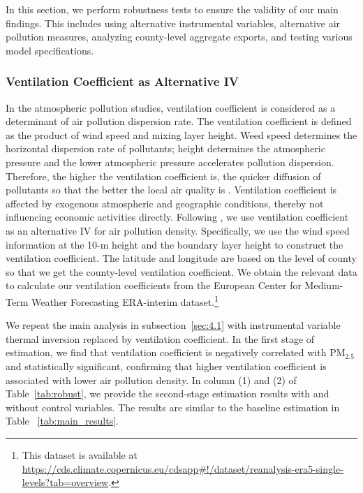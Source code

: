 \documentclass[12pt]{article}
\begin{document}
In this section, we perform robustness tests to ensure the validity of our main findings. This includes using alternative instrumental variables, alternative air pollution measures, analyzing county-level aggregate exports, and testing various model specifications.

\subsubsection{Ventilation Coefficient as Alternative IV}
In the atmospheric pollution studies, ventilation coefficient is considered as a determinant of air pollution dispersion rate.
The ventilation coefficient is defined as the product of wind speed and mixing layer height. Weed speed determines the horizontal dispersion rate
of pollutants; height determines the atmospheric pressure and the lower atmospheric pressure accelerates pollution dispersion. Therefore, the higher
the ventilation coefficient is, the quicker diffusion of pollutants so that the better the local air quality is \citep{arya1999air}. Ventilation coefficient 
is affected by exogenous atmospheric and geographic conditions, thereby not influencing economic activities directly. Following \citep{broner2012sources,hering2014environmental,shi2018environmental,
wu2021greening}, we use ventilation coefficient
as an alternative IV for air pollution density. Specifically, we use the wind speed information at the 10-m height and the boundary layer height to construct the ventilation
coefficient. The latitude and longitude are based on the level of county so
that we get the county-level ventilation coefficient. We obtain the relevant
data to calculate our ventilation coefficients from the European Center for
Medium-Term Weather Forecasting ERA-interim dataset.\footnote{This dataset is available at \url{https://cds.climate.copernicus.eu/cdsapp\#!/dataset/reanalysis-era5-single-levels?tab=overview}.}

We repeat the main analysis in subsection~\ref{sec:4.1} with instrumental variable
thermal inversion replaced by ventilation coefficient. In the first stage of
estimation, we find that ventilation coefficient is negatively correlated
with $\mathrm{PM_{2.5}}$ and statistically significant, confirming that
higher ventilation coefficient is associated with lower air pollution
density. In column (1) and (2) of Table~\ref{tab:robust}, we
provide the second-stage estimation results with and without control variables. The results are similar to the baseline estimation in Table~%
\ref{tab:main_results}.
\end{document}
